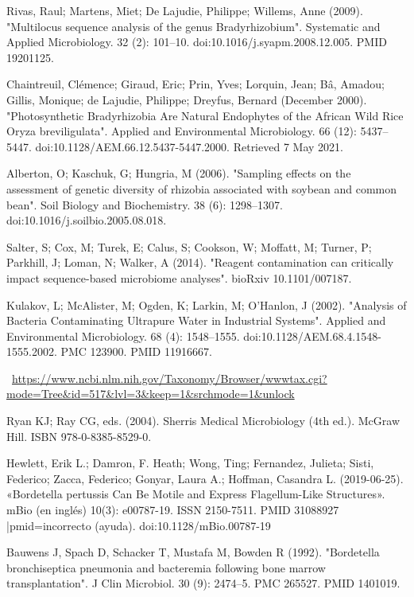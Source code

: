 \documentclass[11pt]{article}
\begin{document}
\begin{thebibliography}{3}
	 Rivas, Raul; Martens, Miet; De Lajudie, Philippe; Willems, Anne (2009). "Multilocus sequence analysis of the genus Bradyrhizobium". Systematic and Applied Microbiology. 32 (2): 101–10. doi:10.1016/j.syapm.2008.12.005. PMID 19201125.
	
	 Chaintreuil, Clémence; Giraud, Eric; Prin, Yves; Lorquin, Jean; Bâ, Amadou; Gillis, Monique; de Lajudie, Philippe; Dreyfus, Bernard (December 2000). "Photosynthetic Bradyrhizobia Are Natural Endophytes of the African Wild Rice Oryza breviligulata". Applied and Environmental Microbiology. 66 (12): 5437–5447. doi:10.1128/AEM.66.12.5437-5447.2000. Retrieved 7 May 2021.
	
	Alberton, O; Kaschuk, G; Hungria, M (2006). "Sampling effects on the assessment of genetic diversity of rhizobia associated with soybean and common bean". Soil Biology and Biochemistry. 38 (6): 1298–1307. doi:10.1016/j.soilbio.2005.08.018.
	
	Salter, S; Cox, M; Turek, E; Calus, S; Cookson, W; Moffatt, M; Turner, P; Parkhill, J; Loman, N; Walker, A (2014). "Reagent contamination can critically impact sequence-based microbiome analyses". bioRxiv 10.1101/007187.
	
	 Kulakov, L; McAlister, M; Ogden, K; Larkin, M; O'Hanlon, J (2002). "Analysis of Bacteria Contaminating Ultrapure Water in Industrial Systems". Applied and Environmental Microbiology. 68 (4): 1548–1555. doi:10.1128/AEM.68.4.1548-1555.2002. PMC 123900. PMID 11916667.
		
	~\url{https://www.ncbi.nlm.nih.gov/Taxonomy/Browser/wwwtax.cgi?mode=Tree\&id=517\&lvl=3\&keep=1\&srchmode=1\&unlock}
		
	 Ryan KJ; Ray CG, eds. (2004). Sherris Medical Microbiology (4th ed.). McGraw Hill. ISBN 978-0-8385-8529-0.
	
	 Hewlett, Erik L.; Damron, F. Heath; Wong, Ting; Fernandez, Julieta; Sisti, Federico; Zacca, Federico; Gonyar, Laura A.; Hoffman, Casandra L. (2019-06-25). «Bordetella pertussis Can Be Motile and Express Flagellum-Like Structures». mBio (en inglés) 10(3): e00787-19. ISSN 2150-7511. PMID 31088927 |pmid=incorrecto (ayuda). doi:10.1128/mBio.00787-19

	 Bauwens J, Spach D, Schacker T, Mustafa M, Bowden R (1992). "Bordetella bronchiseptica pneumonia and bacteremia following bone marrow transplantation". J Clin Microbiol. 30 (9): 2474–5. PMC 265527. PMID 1401019.
	

\end{thebibliography}
\end{document}

